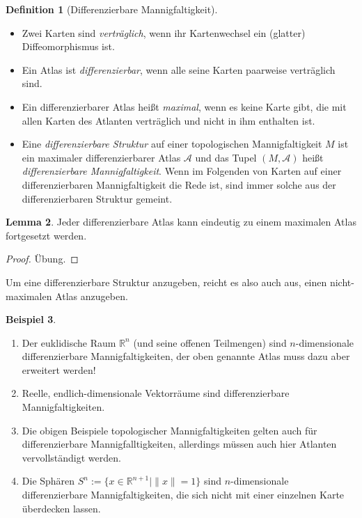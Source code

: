 \documentclass[a4paper]{scrbook}
\numberwithin{equation}{chapter}
\newcommand{\R}{\mathbb{R}}
\theoremstyle{definition}
\newtheorem{defn}{Definition}[section]
\newtheorem{lemma}[defn]{Lemma}
\newtheorem{bsp}[defn]{Beispiel}
\newcommand{\bewUeb}{\begin{proof}Übung.\end{proof}}
\begin{document}
		\begin{defn}[Differenzierbare Mannigfaltigkeit]\hfill
			\begin{itemize}
				\item Zwei Karten sind \emph{verträglich}, wenn ihr Kartenwechsel ein (glatter) Diffeomorphismus ist.
				\item Ein Atlas ist \emph{differenzierbar}, wenn alle seine Karten paarweise verträglich sind.
				\item Ein differenzierbarer Atlas heißt \emph{maximal}, wenn es keine Karte gibt, die mit allen Karten des Atlanten verträglich und nicht in ihm enthalten ist.
				\item Eine \emph{differenzierbare Struktur} auf einer topologischen Mannigfaltigkeit $M$ ist ein maximaler differenzierbarer Atlas $\mathcal{A}$ und das Tupel $(M,\mathcal{A})$ heißt \emph{differenzierbare Mannigfaltigkeit}. Wenn im Folgenden von Karten auf einer differenzierbaren Mannigfaltigkeit die Rede ist, sind immer solche aus der differenzierbaren Struktur gemeint.
			\end{itemize}
		\end{defn}
		\begin{lemma}
			Jeder differenzierbare Atlas kann eindeutig zu einem maximalen Atlas fortgesetzt werden. \bewUeb
		\end{lemma}
		Um eine differenzierbare Struktur anzugeben, reicht es also auch aus, einen nicht-maximalen Atlas anzugeben.
		\begin{bsp}\hfill 
			\begin{enumerate}[label=(\alph*)]
				\item Der euklidische Raum $\R^n$ (und seine offenen Teilmengen) sind $n$-dimensionale differenzierbare Mannigfaltigkeiten, der oben genannte Atlas muss dazu aber erweitert werden!
				\item Reelle, endlich-dimensionale Vektorräume sind differenzierbare Mannigfaltigkeiten.
				\item Die obigen Beispiele topologischer Mannigfaltigkeiten gelten auch für differenzierbare Mannigfalltigkeiten, allerdings müssen auch hier Atlanten vervollständigt werden.
				\item Die Sphären ${S^n:=\lbrace x\in\R^{n+1}\mid \|x\|=1\rbrace}$ sind $n$-dimensionale differenzierbare Mannigfaltigkeiten, die sich nicht mit einer einzelnen Karte überdecken lassen.
			\end{enumerate}
		\end{bsp}
\end{document}
